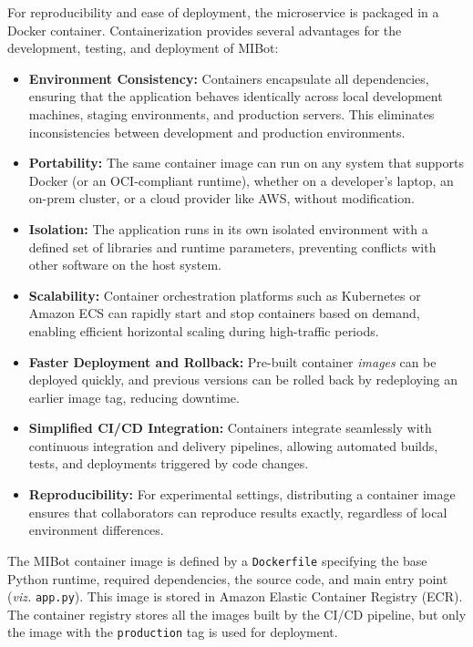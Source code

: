 For reproducibility and ease of deployment, the microservice is packaged in a Docker container. Containerization provides several advantages for the development, testing, and deployment of MIBot:

\begin{itemize}
\item \textbf{Environment Consistency:} Containers encapsulate all dependencies, ensuring that the application behaves identically across local development machines, staging environments, and production servers. This eliminates inconsistencies between development and production environments.

\item \textbf{Portability:} The same container image can run on any system that supports Docker (or an OCI-compliant runtime), whether on a developer's laptop, an on-prem cluster, or a cloud provider like AWS, without modification.

\item \textbf{Isolation:} The application runs in its own isolated environment with a defined set of libraries and runtime parameters, preventing conflicts with other software on the host system.

\item \textbf{Scalability:} Container orchestration platforms such as Kubernetes or Amazon ECS can rapidly start and stop containers based on demand, enabling efficient horizontal scaling during high-traffic periods.

\item \textbf{Faster Deployment and Rollback:} Pre-built container \emph{images} can be deployed quickly, and previous versions can be rolled back by redeploying an earlier image tag, reducing downtime.

\item \textbf{Simplified CI/CD Integration:} Containers integrate seamlessly with continuous integration and delivery pipelines, allowing automated builds, tests, and deployments triggered by code changes.

\item \textbf{Reproducibility:} For experimental settings, distributing a container image ensures that collaborators can reproduce results exactly, regardless of local environment differences.
\end{itemize}

The MIBot container image is defined by a \texttt{Dockerfile} specifying the base Python runtime, required dependencies, the source code, and main entry point (\emph{viz.} \texttt{app.py}). This image is stored in Amazon Elastic Container Registry (ECR). The container registry stores all the images built by the CI/CD pipeline, but only the image with the \texttt{production} tag is used for deployment.

